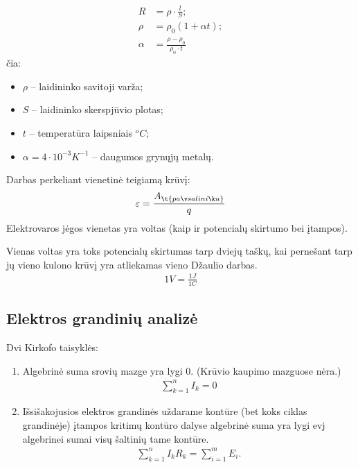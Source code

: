\begin{defn}[Varža]
  \begin{align*}
    R &= \rho \cdot \frac{l}{S}; \\
    \rho &= \rho_{0} (1 + \alpha t); \\
    \alpha &= \frac{\rho - \rho_{0}}{\rho_{0} \cdot t}
  \end{align*}
  čia:
  \begin{itemize}
    \item $\rho$ – laidininko savitoji varža;
    \item $S$ – laidininko skerspjūvio plotas;
    \item $t$ – temperatūra laipsniais ${}^{o}C$;
    \item $\alpha = 4 \cdot 10^{-3} K^{-1}$ – daugumos grynųjų metalų.
  \end{itemize}
\end{defn}


\begin{defn}
  Darbas perkeliant vienetinė teigiamą krūvį:
  \begin{equation*}
    \varepsilon = \frac{A_{\t{pašalinių}}}{q}
  \end{equation*}
  Elektrovaros jėgos vienetas yra voltas (kaip ir potencialų skirtumo
  bei įtampos).
\end{defn}

\begin{defn}
  Vienas voltas yra toks potencialų skirtumas tarp dviejų taškų, kai
  pernešant tarp jų vieno kulono krūvį yra atliekamas vieno Džaulio
  darbas.
  \begin{align*}
    1 V = \frac{1J}{1C}
  \end{align*}
\end{defn}

\subsection{Elektros grandinių analizė}

Dvi Kirkofo taisyklės:
\begin{enumerate}
  \item Algebrinė suma srovių mazge yra lygi 0. (Krūvio kaupimo mazguose
    nėra.)
    \begin{align*}
      \sum ^{n} _{k=1} I_{k} = 0
    \end{align*}
  \item Išsišakojusios elektros grandinės uždarame kontūre (bet koks ciklas 
    grandinėje) įtampos kritimų kontūro dalyse algebrinė suma yra
    lygi evj algebrinei sumai visų šaltinių tame kontūre.
    \begin{align*}
      \sum _{k=1} ^{n} I_{k} R_{k} = \sum _{i=1} ^{m} E_{i}.
    \end{align*}
\end{enumerate}

